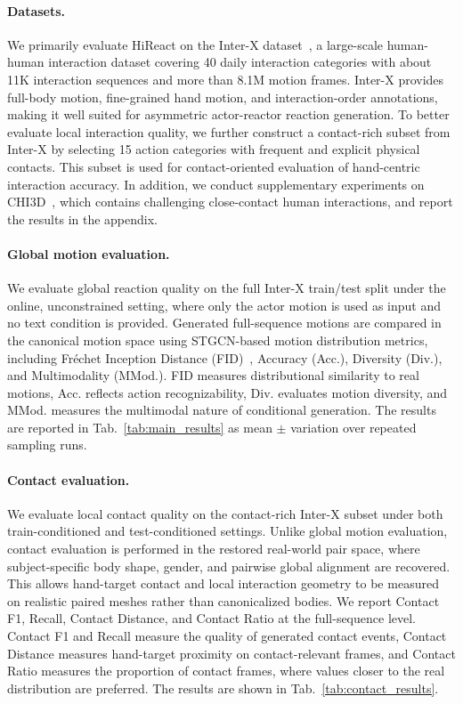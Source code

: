 \documentclass{article}
\begin{document}
\paragraph{Datasets.}
We primarily evaluate HiReact on the Inter-X dataset~\cite{xu2024inter}, a large-scale human-human interaction dataset covering 40 daily interaction categories with about 11K interaction sequences and more than 8.1M motion frames. Inter-X provides full-body motion, fine-grained hand motion, and interaction-order annotations, making it well suited for asymmetric actor-reactor reaction generation. To better evaluate local interaction quality, we further construct a contact-rich subset from Inter-X by selecting 15 action categories with frequent and explicit physical contacts. This subset is used for contact-oriented evaluation of hand-centric interaction accuracy. In addition, we conduct supplementary experiments on CHI3D~\cite{fieraru2020three}, which contains challenging close-contact human interactions, and report the results in the appendix.

\paragraph{Global motion evaluation.}
We evaluate global reaction quality on the full Inter-X train/test split under the online, unconstrained setting, where only the actor motion is used as input and no text condition is provided. Generated full-sequence motions are compared in the canonical motion space using STGCN-based motion distribution metrics, including Fr\'echet Inception Distance (FID)~\cite{heusel2017gans}, Accuracy (Acc.), Diversity (Div.), and Multimodality (MMod.). FID measures distributional similarity to real motions, Acc. reflects action recognizability, Div. evaluates motion diversity, and MMod. measures the multimodal nature of conditional generation. The results are reported in Tab.~\ref{tab:main_results} as mean $\pm$ variation over repeated sampling runs.

\paragraph{Contact evaluation.}
We evaluate local contact quality on the contact-rich Inter-X subset under both train-conditioned and test-conditioned settings. Unlike global motion evaluation, contact evaluation is performed in the restored real-world pair space, where subject-specific body shape, gender, and pairwise global alignment are recovered. This allows hand-target contact and local interaction geometry to be measured on realistic paired meshes rather than canonicalized bodies. We report Contact F1, Recall, Contact Distance, and Contact Ratio at the full-sequence level. Contact F1 and Recall measure the quality of generated contact events, Contact Distance measures hand-target proximity on contact-relevant frames, and Contact Ratio measures the proportion of contact frames, where values closer to the real distribution are preferred. The results are shown in Tab.~\ref{tab:contact_results}.
\end{document}
